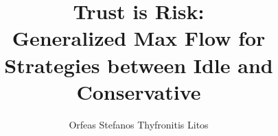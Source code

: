 \title{Trust is Risk: \\ Generalized Max Flow for Strategies between Idle and Conservative}
\author{Orfeas Stefanos Thyfronitis Litos}
\maketitle
